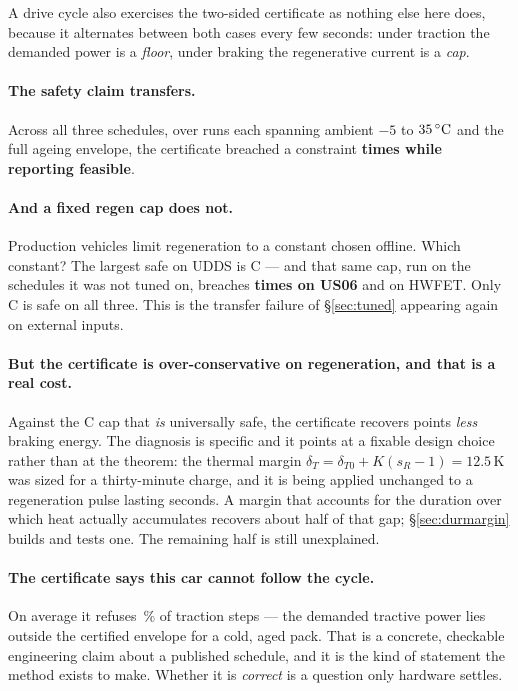 \documentclass[11pt,letterpaper]{article}
\theoremstyle{definition}
\theoremstyle{remark}
\newcommand{\SI}[2]{#1\,#2}
\newcommand{\degreeCelsius}{\degC}
\newcommand{\degC}{\ifmmode{^\circ}\mathrm{C}\else\textdegree C\fi}
\begin{document}
A drive cycle also exercises the two-sided certificate as nothing else here does, because it
alternates between both cases every few seconds: under traction the demanded power is a
\emph{floor}, under braking the regenerative current is a \emph{cap}.

\paragraph{The safety claim transfers.} Across all three schedules, over \dRepeats{} runs each
spanning ambient $-5$ to $\SI{35}{\degreeCelsius}$ and the full ageing envelope, the certificate breached a
constraint \textbf{\dCertBreach{} times while reporting feasible}.

\paragraph{And a fixed regen cap does not.} Production vehicles limit regeneration to a constant
chosen offline. Which constant? The largest safe on UDDS is \dTunedCap{}C --- and that same cap,
run on the schedules it was not tuned on, breaches \textbf{\dTunedBreachUSsix{} times on US06}
and \dTunedBreachHwy{} on HWFET. Only \dUniversalCap{}C is safe on all three. This is the
transfer failure of \S\ref{sec:tuned} appearing again on external inputs.

\paragraph{But the certificate is over-conservative on regeneration, and that is a real cost.}
Against the \dUniversalCap{}C cap that \emph{is} universally safe, the certificate recovers
\dGainVsUniversal{} points \emph{less} braking energy. The diagnosis is specific and it points
at a fixable design choice rather than at the theorem: the thermal margin
$\delta_T = \delta_{T0} + K(s_R-1) = 12.5$\,K was sized for a thirty-minute charge, and it is
being applied unchanged to a regeneration pulse lasting seconds. A margin that accounts for the duration
over which heat actually accumulates recovers about half of that gap; \S\ref{sec:durmargin}
builds and tests one. The remaining half is still unexplained.

\paragraph{The certificate says this car cannot follow the cycle.} On average it refuses
\dRefusalPct\,\% of traction steps --- the demanded tractive power lies outside the certified
envelope for a cold, aged pack. That is a concrete, checkable engineering claim about a
published schedule, and it is the kind of statement the method exists to make. Whether it is
\emph{correct} is a question only hardware settles.
\end{document}
